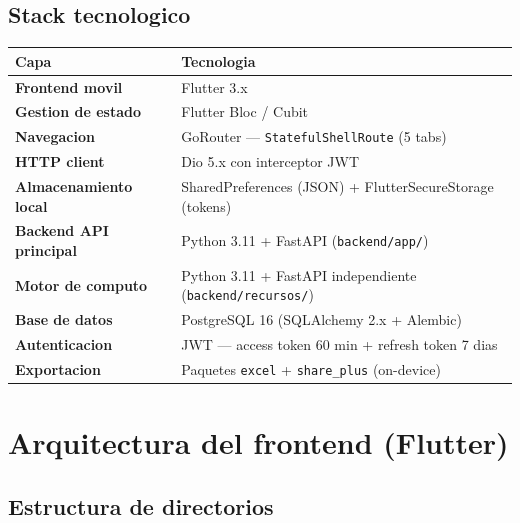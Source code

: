 \documentclass[12pt, a4paper]{article}
\begin{document}
\subsection{Stack tecnologico}

\begin{longtable}{>{\bfseries}p{4.5cm} p{9.5cm}}
  \toprule
  Capa & Tecnologia \\
  \midrule
  \endhead
  Frontend movil         & Flutter 3.x \\
  Gestion de estado      & Flutter Bloc / Cubit \\
  Navegacion             & GoRouter --- \texttt{StatefulShellRoute} (5 tabs) \\
  HTTP client            & Dio 5.x con interceptor JWT \\
  Almacenamiento local   & SharedPreferences (JSON) + FlutterSecureStorage (tokens) \\
  Backend API principal  & Python 3.11 + FastAPI (\texttt{backend/app/}) \\
  Motor de computo       & Python 3.11 + FastAPI independiente (\texttt{backend/recursos/}) \\
  Base de datos          & PostgreSQL 16 (SQLAlchemy 2.x + Alembic) \\
  Autenticacion          & JWT --- access token 60 min + refresh token 7 dias \\
  Exportacion            & Paquetes \texttt{excel} + \texttt{share\_plus} (on-device) \\
  \bottomrule
\end{longtable}

\section{Arquitectura del frontend (Flutter)}

\subsection{Estructura de directorios}
\end{document}
